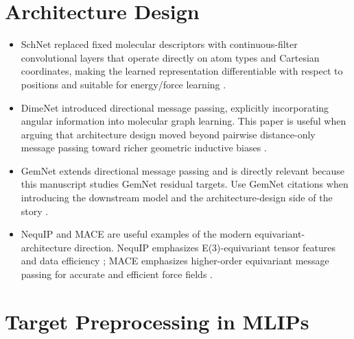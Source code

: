 \documentclass[11pt]{article}
\begin{document}
\section{Architecture Design}

\begin{itemize}
  \item SchNet replaced fixed molecular descriptors with continuous-filter convolutional layers that operate directly on atom types and Cartesian coordinates, making the learned representation differentiable with respect to positions and suitable for energy/force learning \cite{schutt2017schnet}.

  \item DimeNet introduced directional message passing, explicitly incorporating angular information into molecular graph learning. This paper is useful when arguing that architecture design moved beyond pairwise distance-only message passing toward richer geometric inductive biases \cite{gasteiger2020dimenet}.

  \item GemNet extends directional message passing and is directly relevant because this manuscript studies GemNet residual targets. Use GemNet citations when introducing the downstream model and the architecture-design side of the story \cite{gasteiger2021gemnet}.

  \item NequIP and MACE are useful examples of the modern equivariant-architecture direction. NequIP emphasizes E(3)-equivariant tensor features and data efficiency \cite{batzner2022nequip}; MACE emphasizes higher-order equivariant message passing for accurate and efficient force fields \cite{batatia2022mace}.
\end{itemize}

\section{Target Preprocessing in MLIPs}
\end{document}
